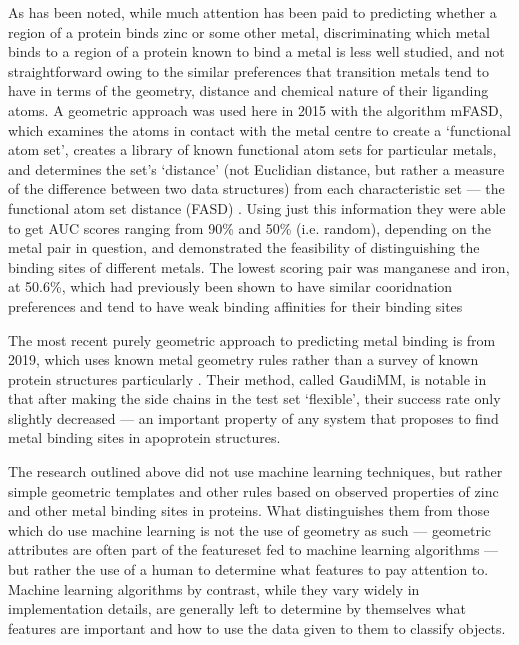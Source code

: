 As has been noted, while much attention has been paid to predicting whether a region of a protein binds zinc or some other metal, discriminating which metal binds to a region of a protein known to bind a metal is less well studied, and not straightforward owing to the similar preferences that transition metals tend to have in terms of the geometry, distance and chemical nature of their liganding atoms. A geometric approach was used here in 2015 with the algorithm mFASD, which examines the atoms in contact with the metal centre to create a `functional atom set', creates a library of known functional atom sets for particular metals, and determines the set's `distance' (not Euclidian distance, but rather a measure of the difference between two data structures) from each characteristic set --- the functional atom set distance (FASD) \cite{he2015}. Using just this information they were able to get AUC scores ranging from 90\% and 50\% (i.e. random), depending on the metal pair in question, and demonstrated the feasibility of distinguishing the binding sites of different metals. The lowest scoring pair was manganese and iron, at 50.6\%, which had previously been shown to have similar cooridnation preferences and tend to have weak binding affinities for their binding sites \cite{cotruvo2012mis}

The most recent purely geometric approach to predicting metal binding is from 2019, which uses known metal geometry rules rather than a survey of known protein structures particularly \cite{sciortino2019}. Their method, called GaudiMM, is notable in that after making the side chains in the test set `flexible', their success rate only slightly decreased --- an important property of any system that proposes to find metal binding sites in apoprotein structures.

The research outlined above did not use machine learning techniques, but rather simple geometric templates and other rules based on observed properties of zinc and other metal binding sites in proteins. What distinguishes them from those which do use machine learning is not the use of geometry as such --- geometric attributes are often part of the featureset fed to machine learning algorithms --- but rather the use of a human to determine what features to pay attention to. Machine learning algorithms by contrast, while they vary widely in implementation details, are generally left to determine by themselves what features are important and how to use the data given to them to classify objects.

